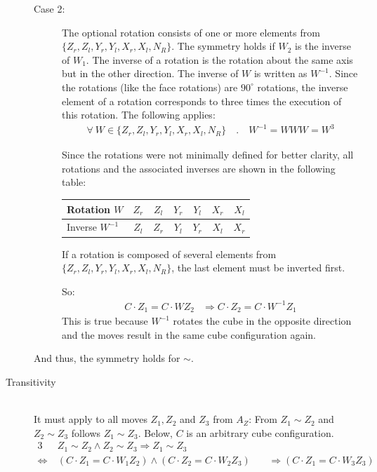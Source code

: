 \documentclass[12pt,a4paper]{article}
\theoremstyle{custom}
\begin{document}
\begin{description}
\begin{description}
\item[Case 2:]
The optional rotation consists of one or more elements from $\{{Z_r}, {Z_l}, {Y_r}, {Y_l}, {X_r}, {X_l}, N_R\}$.
The symmetry holds if $W_2$ is the inverse of $W_1$. The inverse of a rotation is the rotation about the same axis but in the other direction.
The inverse of $W$ is written as $W^{-1}$.
Since the rotations (like the face rotations) are $90^\circ$ rotations, the inverse element of a rotation corresponds to three times the execution of this rotation.
The following applies:
\begin{align*}
\forall \ W \in \{Z_r, Z_l, Y_r, Y_l, X_r, X_l, N_R\} \quad . \quad W^{-1} = WWW = W^3
\end{align*}

Since the rotations were not minimally defined for better clarity, all rotations and the associated inverses are shown in the following table:

\begin{center}
\begin{tabular}{lcccccc}
Rotation $W$ & ${Z_r}$ & ${Z_l}$ & ${Y_r}$ & ${Y_l}$ & ${X_r}$ & ${X_l}$ \\
\hline
Inverse \hspace*{0.1em} $W^{-1}$ & ${Z_l}$ & ${Z_r}$ & ${Y_l}$ & ${Y_r}$ & ${X_l}$ & ${X_r }$ \\
\end{tabular}
\end{center}


If a rotation is composed of several elements from $\{{Z_r}, {Z_l}, {Y_r}, {Y_l}, {X_r}, {X_l}, N_R\}$, the last element must be inverted first.  

So:
\begin{align*}
C \cdot Z_1 = C \cdot W Z_2 & \Rightarrow C \cdot Z_2 = C \cdot W^{-1} Z_1
\end{align*}
This is true because $W^{-1}$ rotates the cube in the opposite direction and the moves result in the same cube configuration again.

\end{description}

And thus, the symmetry holds for $\sim$.



\item [Transitivity] \ \\
It must apply to all moves $Z_1, Z_2$ and $Z_3$ from $A_Z$: From $Z_1 \sim Z_2$ and $Z_2 \sim Z_3$ follows $Z_1 \sim Z_3$. Below, $C$ is an arbitrary cube configuration.
\begin{alignat*}{3}
& Z_1 \sim Z_2  \wedge Z_2 \sim Z_3  \Rightarrow Z_1 \sim Z_3 \\
\Leftrightarrow \ & (C \cdot Z_1 = C \cdot W_1Z_2) \wedge (C \cdot Z_2 = C \cdot W_2Z_3) \ && \Rightarrow (C \cdot Z_1 = C \cdot W_3Z_3)
\end{alignat*}


\end{description}
\end{document}
